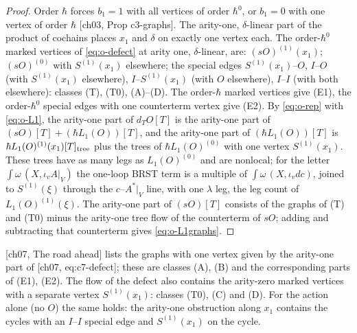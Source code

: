 \begin{proof}
Order $\hbar$ forces $b_1=1$ with all vertices of order $\hbar^0$, or $b_1=0$ with one vertex of order $\hbar$ [ch03, Prop c3-graphs]. The arity-one, $\delta$-linear part of the product of cochains places $x_1$ and $\delta$ on exactly one vertex each. The order-$\hbar^0$ marked vertices of \eqref{eq:o-defect} at arity one, $\delta$-linear, are: $(sO)^{(1)}(x_1)$; $(sO)^{(0)}$ with $S^{(1)}(x_1)$ elsewhere; the special edges $S^{(1)}(x_1)$--$O$, $I$--$O$ (with $S^{(1)}(x_1)$ elsewhere), $I$--$S^{(1)}(x_1)$ (with $O$ elsewhere), $I$--$I$ (with both elsewhere): classes (T), (T0), (A)--(D). The order-$\hbar$ marked vertices give (E1), the order-$\hbar^0$ special edges with one counterterm vertex give (E2). By \eqref{eq:o-rep} with \eqref{eq:o-L1}, the arity-one part of $d_TO[T]$ is the arity-one part of $(sO)[T]+(\hbar L_1(O))[T]$, and the arity-one part of $(\hbar L_1(O))[T]$ is $\hbar L_1(O)^{(1)}(x_1)[T]_{\rm tree}$ plus the trees of $\hbar L_1(O)^{(0)}$ with one vertex $S^{(1)}(x_1)$. These trees have as many legs as $L_1(O)^{(0)}$ and are nonlocal; for the letter $\int\omega\,(X,\iota_vA|_V)$ the one-loop BRST term is a multiple of $\int\omega\,(X,\iota_vdc)$, joined to $S^{(1)}(\xi)$ through the $c$--$A^*|_V$ line, with one $\lambda$ leg, the leg count of $L_1(O)^{(1)}(\xi)$. The arity-one part of $(sO)[T]$ consists of the graphs of (T) and (T0) minus the arity-one tree flow of the counterterm of $sO$; adding and subtracting that counterterm gives \eqref{eq:o-L1graphs}.
\end{proof}

\begin{remark}
\label{rem:o-roadahead}
[ch07, The road ahead] lists the graphs with one vertex given by the arity-one part of [ch07, eq:c7-defect]; these are classes (A), (B) and the corresponding parts of (E1), (E2). The flow of the defect also contains the arity-zero marked vertices with a separate vertex $S^{(1)}(x_1)$: classes (T0), (C) and (D). For the action alone (no $O$) the same holds: the arity-one obstruction along $x_1$ contains the cycles with an $I$--$I$ special edge and $S^{(1)}(x_1)$ on the cycle.
\end{remark}

